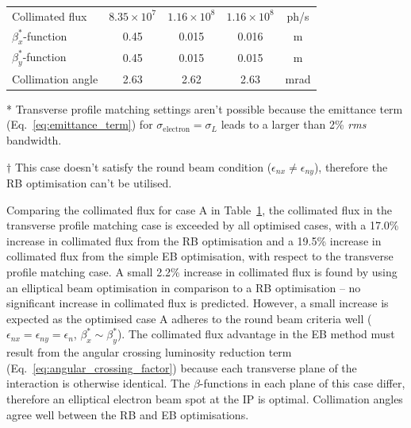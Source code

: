 \documentclass[../main.tex]{subfiles}
\begin{document}
\begin{table}[!h]
\begin{threeparttable}
\begin{tabular}{lcccc}
\hline
Collimated flux & $8.35\times 10^{7}$ & $1.16\times 10^{8}$ & $1.16\times 10^{8}$ & ph/\si{\second} \\
$\beta_{x}^{*}$-function & 0.45 & 0.015 & 0.016 & \si{\meter} \\
$\beta_{y}^{*}$-function & 0.45 & 0.015 & 0.015 & \si{\meter} \\
Collimation angle & 2.63 & 2.62 & 2.63 & \si{\milli\radian}\\
\hline\hline
\end{tabular}
\begin{tablenotes}
\item[*]{Transverse profile matching settings aren't possible because the emittance term (Eq.~\ref{eq:emittance_term}) for $\sigma_{\mathrm{electron}} = \sigma_{L}$ leads to a larger than 2\% \textit{rms} bandwidth.}
\item[$\dagger$]{This case doesn't satisfy the round beam condition ($\epsilon_{nx} \neq \epsilon_{ny}$), therefore the RB optimisation can't be utilised.}
\end{tablenotes}
\end{threeparttable}
\label{tab:single_point_optimisations}
\end{table}

Comparing the collimated flux for case A in Table~\ref{tab:single_point_optimisations}, the collimated flux in the transverse profile matching case is exceeded by all optimised cases, with a 17.0\% increase in collimated flux from the RB optimisation and a 19.5\% increase in collimated flux from the simple EB optimisation, with respect to the transverse profile matching case. A small 2.2\% increase in collimated flux is found by using an elliptical beam optimisation in comparison to a RB optimisation -- no significant increase in collimated flux is predicted. However, a small increase is expected as the optimised case A adheres to the round beam criteria well ($\epsilon_{nx}=\epsilon_{ny}=\epsilon_{n}$, $\beta_{x}^{*}\sim\beta_{y}^{*}$). The collimated flux advantage in the EB method must result from the angular crossing luminosity reduction term (Eq.~\ref{eq:angular_crossing_factor}) because each transverse plane of the interaction is otherwise identical. The $\beta$-functions in each plane of this case differ, therefore an elliptical electron beam spot at the IP is optimal. Collimation angles agree well between the RB and EB optimisations.
\end{document}
